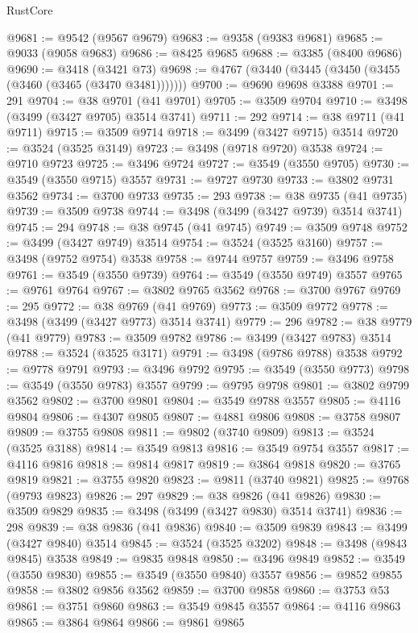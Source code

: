 \begin{lexlean}{RustCore}
\begin{coremodule}
@9681 := @9542 (@9567 @9679)
@9683 := @9358 (@9383 @9681)
@9685 := @9033 (@9058 @9683)
@9686 := @8425 @9685
@9688 := @3385 (@8400 @9686)
@9690 := @3418 (@3421 @73)
@9698 := @4767 (@3440 (@3445 (@3450 (@3455 (@3460 (@3465 (@3470 @3481)))))))
@9700 := @9690 @9698 @3388
@9701 := 291
@9704 := @38 @9701 (@41 @9701)
@9705 := @3509 @9704
@9710 := @3498 (@3499 (@3427 @9705) @3514 @3741)
@9711 := 292
@9714 := @38 @9711 (@41 @9711)
@9715 := @3509 @9714
@9718 := @3499 (@3427 @9715) @3514
@9720 := @3524 (@3525 @3149)
@9723 := @3498 (@9718 @9720) @3538
@9724 := @9710 @9723
@9725 := @3496 @9724
@9727 := @3549 (@3550 @9705)
@9730 := @3549 (@3550 @9715) @3557
@9731 := @9727 @9730
@9733 := @3802 @9731 @3562
@9734 := @3700 @9733
@9735 := 293
@9738 := @38 @9735 (@41 @9735)
@9739 := @3509 @9738
@9744 := @3498 (@3499 (@3427 @9739) @3514 @3741)
@9745 := 294
@9748 := @38 @9745 (@41 @9745)
@9749 := @3509 @9748
@9752 := @3499 (@3427 @9749) @3514
@9754 := @3524 (@3525 @3160)
@9757 := @3498 (@9752 @9754) @3538
@9758 := @9744 @9757
@9759 := @3496 @9758
@9761 := @3549 (@3550 @9739)
@9764 := @3549 (@3550 @9749) @3557
@9765 := @9761 @9764
@9767 := @3802 @9765 @3562
@9768 := @3700 @9767
@9769 := 295
@9772 := @38 @9769 (@41 @9769)
@9773 := @3509 @9772
@9778 := @3498 (@3499 (@3427 @9773) @3514 @3741)
@9779 := 296
@9782 := @38 @9779 (@41 @9779)
@9783 := @3509 @9782
@9786 := @3499 (@3427 @9783) @3514
@9788 := @3524 (@3525 @3171)
@9791 := @3498 (@9786 @9788) @3538
@9792 := @9778 @9791
@9793 := @3496 @9792
@9795 := @3549 (@3550 @9773)
@9798 := @3549 (@3550 @9783) @3557
@9799 := @9795 @9798
@9801 := @3802 @9799 @3562
@9802 := @3700 @9801
@9804 := @3549 @9788 @3557
@9805 := @4116 @9804
@9806 := @4307 @9805
@9807 := @4881 @9806
@9808 := @3758 @9807
@9809 := @3755 @9808
@9811 := @9802 (@3740 @9809)
@9813 := @3524 (@3525 @3188)
@9814 := @3549 @9813
@9816 := @3549 @9754 @3557
@9817 := @4116 @9816
@9818 := @9814 @9817
@9819 := @3864 @9818
@9820 := @3765 @9819
@9821 := @3755 @9820
@9823 := @9811 (@3740 @9821)
@9825 := @9768 (@9793 @9823)
@9826 := 297
@9829 := @38 @9826 (@41 @9826)
@9830 := @3509 @9829
@9835 := @3498 (@3499 (@3427 @9830) @3514 @3741)
@9836 := 298
@9839 := @38 @9836 (@41 @9836)
@9840 := @3509 @9839
@9843 := @3499 (@3427 @9840) @3514
@9845 := @3524 (@3525 @3202)
@9848 := @3498 (@9843 @9845) @3538
@9849 := @9835 @9848
@9850 := @3496 @9849
@9852 := @3549 (@3550 @9830)
@9855 := @3549 (@3550 @9840) @3557
@9856 := @9852 @9855
@9858 := @3802 @9856 @3562
@9859 := @3700 @9858
@9860 := @3753 @53
@9861 := @3751 @9860
@9863 := @3549 @9845 @3557
@9864 := @4116 @9863
@9865 := @3864 @9864
@9866 := @9861 @9865

\end{coremodule}
\end{lexlean}
